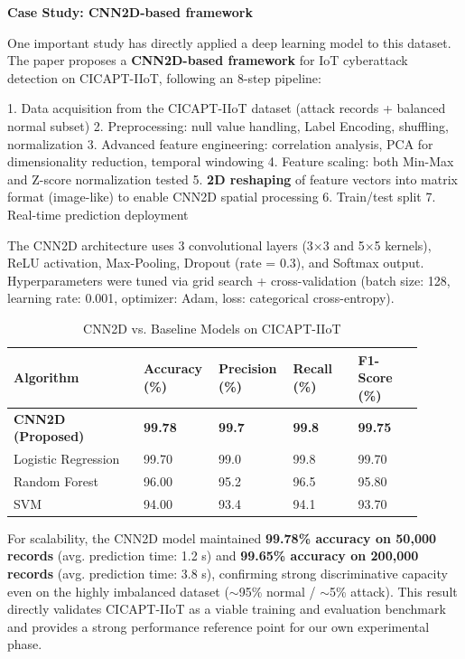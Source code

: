 \textbf{Case Study: CNN2D-based framework \cite{SharmilaD2026CNN2D}}

One important study \cite{SharmilaD2026CNN2D} has directly applied a deep learning model to this dataset. The paper proposes a \textbf{CNN2D-based framework} for IoT cyberattack detection on CICAPT-IIoT, following an 8-step pipeline:

1. Data acquisition from the CICAPT-IIoT dataset (attack records + balanced normal subset)
2. Preprocessing: null value handling, Label Encoding, shuffling, normalization
3. Advanced feature engineering: correlation analysis, PCA for dimensionality reduction, temporal windowing
4. Feature scaling: both Min-Max and Z-score normalization tested
5. \textbf{2D reshaping} of feature vectors into matrix format (image-like) to enable CNN2D spatial processing
6. Train/test split
7. Real-time prediction deployment

The CNN2D architecture uses 3 convolutional layers (3$\times$3 and 5$\times$5 kernels), ReLU activation, Max-Pooling, Dropout (rate = 0.3), and Softmax output. Hyperparameters were tuned via grid search + cross-validation (batch size: 128, learning rate: 0.001, optimizer: Adam, loss: categorical cross-entropy).


\begin{table}[H]
\centering
\caption{CNN2D vs. Baseline Models on CICAPT-IIoT \protect\cite{ghiasvand2024cicapt}}
\medskip
\begin{tabular}{|p{0.3\linewidth}|p{0.15\linewidth}|p{0.15\linewidth}|p{0.15\linewidth}|p{0.15\linewidth}|}
\hline
\textbf{Algorithm} & \textbf{Accuracy (\%)} & \textbf{Precision (\%)} & \textbf{Recall (\%)} & \textbf{F1-Score (\%)} \\
\hline
\textbf{CNN2D (Proposed)} & \textbf{99.78} & \textbf{99.7} & \textbf{99.8} & \textbf{99.75} \\
\hline
Logistic Regression & 99.70 & 99.0 & 99.8 & 99.70 \\
\hline
Random Forest & 96.00 & 95.2 & 96.5 & 95.80 \\
\hline
SVM & 94.00 & 93.4 & 94.1 & 93.70 \\
\hline
\end{tabular}
\end{table}

For scalability, the CNN2D model maintained \textbf{99.78\% accuracy on 50,000 records} (avg. prediction time: 1.2 s) and \textbf{99.65\% accuracy on 200,000 records} (avg. prediction time: 3.8 s), confirming strong discriminative capacity even on the highly imbalanced dataset ($\sim$95\% normal / $\sim$5\% attack). This result directly validates CICAPT-IIoT \cite{ghiasvand2024cicapt} as a viable training and evaluation benchmark and provides a strong performance reference point for our own experimental phase.

